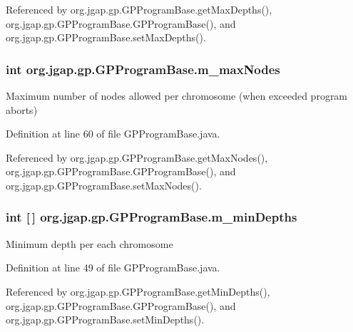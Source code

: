 Referenced by org.\-jgap.\-gp.\-G\-P\-Program\-Base.\-get\-Max\-Depths(), org.\-jgap.\-gp.\-G\-P\-Program\-Base.\-G\-P\-Program\-Base(), and org.\-jgap.\-gp.\-G\-P\-Program\-Base.\-set\-Max\-Depths().

\hypertarget{classorg_1_1jgap_1_1gp_1_1_g_p_program_base_a9f3daf47a4ce44801a763774b6144657}{
\subsubsection[{m\-\_\-max\-Nodes}]{\setlength{\rightskip}{0pt plus 5cm}int org.\-jgap.\-gp.\-G\-P\-Program\-Base.\-m\-\_\-max\-Nodes\hspace{0.3cm}{\ttfamily [private]}}}\label{classorg_1_1jgap_1_1gp_1_1_g_p_program_base_a9f3daf47a4ce44801a763774b6144657}
Maximum number of nodes allowed per chromosome (when exceeded program aborts) 

Definition at line 60 of file G\-P\-Program\-Base.\-java.



Referenced by org.\-jgap.\-gp.\-G\-P\-Program\-Base.\-get\-Max\-Nodes(), org.\-jgap.\-gp.\-G\-P\-Program\-Base.\-G\-P\-Program\-Base(), and org.\-jgap.\-gp.\-G\-P\-Program\-Base.\-set\-Max\-Nodes().

\hypertarget{classorg_1_1jgap_1_1gp_1_1_g_p_program_base_af156fd7fa6c12f13684ab5091316b18d}{
\subsubsection[{m\-\_\-min\-Depths}]{\setlength{\rightskip}{0pt plus 5cm}int \mbox{[}$\,$\mbox{]} org.\-jgap.\-gp.\-G\-P\-Program\-Base.\-m\-\_\-min\-Depths\hspace{0.3cm}{\ttfamily [private]}}}\label{classorg_1_1jgap_1_1gp_1_1_g_p_program_base_af156fd7fa6c12f13684ab5091316b18d}
Minimum depth per each chromosome 

Definition at line 49 of file G\-P\-Program\-Base.\-java.



Referenced by org.\-jgap.\-gp.\-G\-P\-Program\-Base.\-get\-Min\-Depths(), org.\-jgap.\-gp.\-G\-P\-Program\-Base.\-G\-P\-Program\-Base(), and org.\-jgap.\-gp.\-G\-P\-Program\-Base.\-set\-Min\-Depths().

